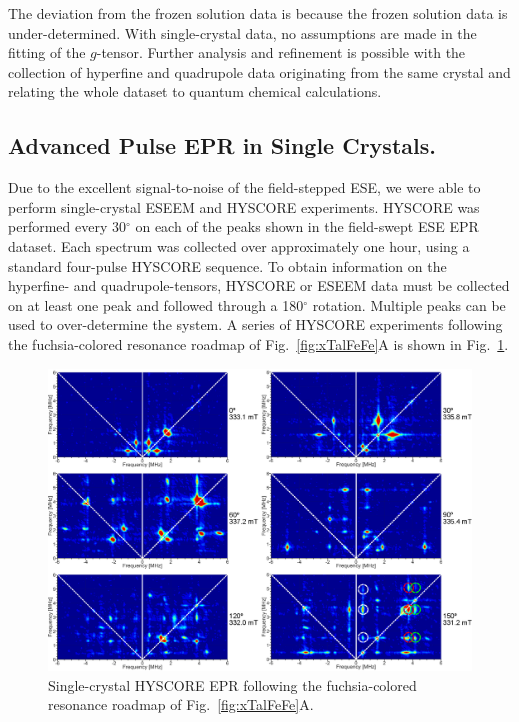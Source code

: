The deviation from the frozen solution data is because the frozen solution data is under-determined. With single-crystal data, no assumptions are made in the fitting of the $g$-tensor. Further analysis and refinement is possible with the collection of hyperfine and quadrupole data originating from the same crystal and relating the whole dataset to quantum chemical calculations.

\subsection{Advanced Pulse EPR in Single Crystals.}
Due to the excellent signal-to-noise of the field-stepped ESE, we were able to perform single-crystal ESEEM and HYSCORE experiments. HYSCORE was performed every 30$^{\circ}$ on each of the peaks shown in the field-swept ESE EPR dataset. Each spectrum was collected over approximately one hour, using a standard four-pulse HYSCORE sequence. \cite{schweiger2001principles} To obtain information on the hyperfine- and quadrupole-tensors, HYSCORE or ESEEM data must be collected on at least one peak and followed through a 180$^{\circ}$ rotation. Multiple peaks can be used to over-determine the system. A series of HYSCORE experiments following the fuchsia-colored resonance roadmap of Fig.~\ref{fig:xTalFeFe}A is shown in Fig.~\ref{fig:FeFeHYSCOREFollow}. 

\begin{figure}[ht]
\centering
 \includegraphics[width=\textwidth]{Kapitel/Ch5-Images/FeFe-FollowHyscore.eps}
 \caption[Single-crystal HYSCORE EPR following a single peak.]{Single-crystal HYSCORE EPR following the fuchsia-colored resonance roadmap of Fig.~\ref{fig:xTalFeFe}A.} \label{fig:FeFeHYSCOREFollow}
\end{figure}

